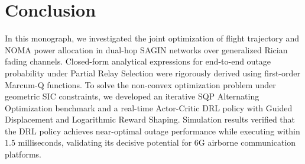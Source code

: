 \section{Conclusion}
\label{sec:conclusion}

In this monograph, we investigated the joint optimization of flight trajectory and NOMA power allocation in dual-hop SAGIN networks over generalized Rician fading channels. Closed-form analytical expressions for end-to-end outage probability under Partial Relay Selection were rigorously derived using first-order Marcum-Q functions. To solve the non-convex optimization problem under geometric SIC constraints, we developed an iterative SQP Alternating Optimization benchmark and a real-time Actor-Critic DRL policy with Guided Displacement and Logarithmic Reward Shaping. Simulation results verified that the DRL policy achieves near-optimal outage performance while executing within $1.5$ milliseconds, validating its decisive potential for 6G airborne communication platforms.

